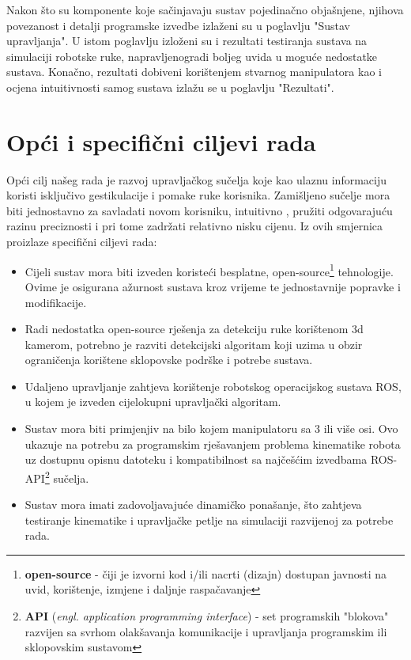 \documentclass[times, utf8, diplomski, numeric]{fer}
\begin{document}
Nakon što su komponente koje sačinjavaju sustav pojedinačno objašnjene, njihova povezanost i detalji programske izvedbe izlaženi su u poglavlju "Sustav upravljanja".
U istom poglavlju izloženi su i rezultati testiranja sustava na simulaciji robotske ruke, napravljenogradi boljeg uvida u moguće nedostatke sustava.
Konačno, rezultati dobiveni korištenjem stvarnog manipulatora kao i ocjena intuitivnosti samog sustava izlažu se u poglavlju "Rezultati".

\chapter{Opći i specifični ciljevi rada}
Opći cilj našeg rada je razvoj upravljačkog sučelja koje kao ulaznu informaciju koristi isključivo gestikulacije i pomake ruke korisnika.
Zamišljeno sučelje mora biti jednostavno za savladati novom korisniku, intuitivno , pružiti odgovarajuću razinu preciznosti i pri tome zadržati relativno nisku cijenu.
Iz ovih smjernica proizlaze specifični ciljevi rada:
\begin{itemize}
\item Cijeli sustav mora biti izveden koristeći besplatne, open-source\footnote{\textbf{open-source} - čiji je izvorni kod i/ili nacrti (dizajn) dostupan javnosti na uvid, korištenje, izmjene i daljnje raspačavanje} tehnologije. 
Ovime je osigurana ažurnost sustava kroz vrijeme te jednostavnije popravke i modifikacije.
\item Radi nedostatka open-source rješenja za detekciju ruke korištenom 3d kamerom, potrebno je razviti detekcijski algoritam koji uzima u obzir ograničenja korištene sklopovske podrške i potrebe sustava.
\item Udaljeno upravljanje zahtjeva korištenje robotskog operacijskog sustava ROS, u kojem je izveden cijelokupni upravljački algoritam.
\item Sustav mora biti primjenjiv na bilo kojem manipulatoru sa 3 ili više osi. Ovo ukazuje na potrebu za programskim rješavanjem problema kinematike robota uz dostupnu opisnu datoteku i kompatibilnost sa najčešćim izvedbama ROS-API\footnote{\textbf{API} (\textit{engl. application programming interface}) - set programskih "blokova" razvijen sa svrhom olakšavanja komunikacije i upravljanja programskim ili sklopovskim sustavom} sučelja.
\item Sustav mora imati zadovoljavajuće dinamičko ponašanje, što zahtjeva testiranje kinematike i upravljačke petlje na simulaciji razvijenoj za potrebe rada.
\end{itemize}
\end{document}
